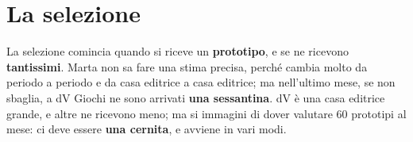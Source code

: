\section{La selezione}
\label{a13:sec:selezione}



La selezione comincia quando si riceve un \textbf{prototipo}, e se ne ricevono
\textbf{tantissimi}. Marta non sa fare una stima precisa, perché cambia molto da periodo a
periodo e da casa editrice a casa editrice; ma nell'ultimo mese, se non sbaglia, a dV
Giochi ne sono arrivati \textbf{una sessantina}. dV è una casa editrice grande, e altre ne
ricevono meno; ma si immagini di dover valutare 60 prototipi al mese: ci deve essere
\textbf{una cernita}, e avviene in vari modi.

